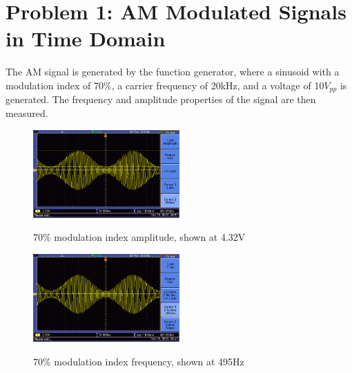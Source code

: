 \section{Problem 1: AM Modulated Signals in Time Domain}
The AM signal is generated by the function generator, where a sinusoid with a modulation index of 70\%, a carrier frequency of 20kHz, and a voltage of 10$V_{pp}$ is generated. The frequency and amplitude properties of the signal are then measured.

\begin{figure}[H]
    \centering
    \includegraphics[width=0.5\textwidth]{images/execution_01_07_amp.png}
    \label{fig:execution_01_07_time}
    \caption{70\% modulation index amplitude, shown at 4.32V}
\end{figure}

\begin{figure}[H]
    \centering
    \includegraphics[width=0.5\textwidth]{images/execution_01_07_freq.png}
    \label{fig:execution_01_07_frequency}
    \caption{70\% modulation index frequency, shown at 495Hz}
\end{figure}

